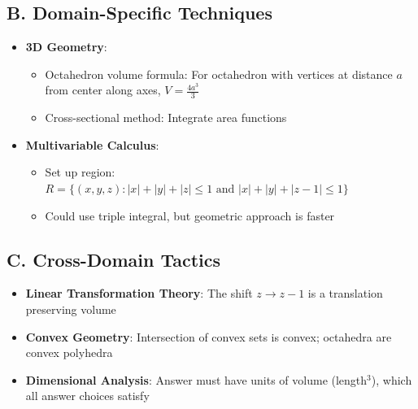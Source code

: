 \documentclass[11pt]{article}
\begin{document}
\begin{tacticalbox}
\subsection*{B. Domain-Specific Techniques}
\begin{itemize}[leftmargin=*]
    \item \textbf{3D Geometry}: 
    \begin{itemize}
        \item Octahedron volume formula: For octahedron with vertices at distance $a$ from center along axes, $V = \frac{4a^3}{3}$
        \item Cross-sectional method: Integrate area functions
    \end{itemize}
    \item \textbf{Multivariable Calculus}: 
    \begin{itemize}
        \item Set up region: $R = \{(x,y,z) : |x|+|y|+|z|\le1 \text{ and } |x|+|y|+|z-1|\le1\}$
        \item Could use triple integral, but geometric approach is faster
    \end{itemize}
\end{itemize}

\subsection*{C. Cross-Domain Tactics}
\begin{itemize}[leftmargin=*]
    \item \textbf{Linear Transformation Theory}: The shift $z \to z-1$ is a translation preserving volume
    \item \textbf{Convex Geometry}: Intersection of convex sets is convex; octahedra are convex polyhedra
    \item \textbf{Dimensional Analysis}: Answer must have units of volume (length$^3$), which all answer choices satisfy
\end{itemize}
\end{tacticalbox}
\end{document}
